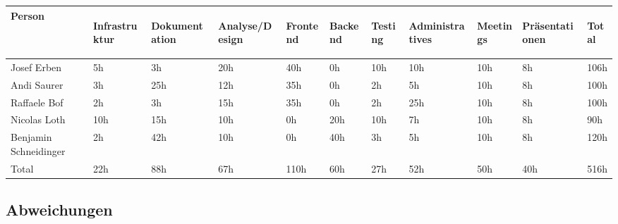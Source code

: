 \begin{longtabu} to \textwidth { | X[l] | l | l | l | l | l | l | l | l | l | l | }
\hline
\textbf{Person} & \begin{turn}{90}\textbf{Infrastruktur}\end{turn} & \begin{turn}{90}\textbf{Dokumentation}\end{turn} & \begin{turn}{90}\textbf{Analyse/Design}\end{turn} & \begin{turn}{90}\textbf{Frontend}\end{turn} & \begin{turn}{90}\textbf{Backend}\end{turn} & \begin{turn}{90}\textbf{Testing}\end{turn} & \begin{turn}{90}\textbf{Administratives}\end{turn} & \begin{turn}{90}\textbf{Meetings}\end{turn} & \begin{turn}{90}\textbf{Präsentationen}\end{turn} & \begin{turn}{90}\textbf{Total}\end{turn} \\\hline
\endhead

Josef Erben           & 5h  & 3h  & 20h & 40h  & 0h  & 10h & 10h & 10h & 8h  & 106h \\\hline
Andi Saurer           & 3h  & 25h & 12h & 35h  & 0h  & 2h  & 5h  & 10h & 8h  & 100h \\\hline
Raffaele Bof          & 2h  & 3h  & 15h & 35h  & 0h  & 2h  & 25h & 10h & 8h  & 100h \\\hline
Nicolas Loth          & 10h & 15h & 10h & 0h   & 20h & 10h & 7h  & 10h & 8h  & 90h \\\hline
Benjamin Schneidinger & 2h  & 42h & 10h & 0h   & 40h & 3h  & 5h  & 10h & 8h  & 120h \\\hline
Total                 & 22h & 88h & 67h & 110h & 60h & 27h & 52h & 50h & 40h & 516h \\\hline
\end{longtabu}

\subsection{Abweichungen}\label{abweichungen}


